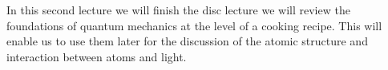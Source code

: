 In this second lecture we will finish the disc lecture we will review the foundations of quantum mechanics at the level of a cooking recipe. This will enable us to use them later for the discussion of the atomic structure and interaction between atoms and light.